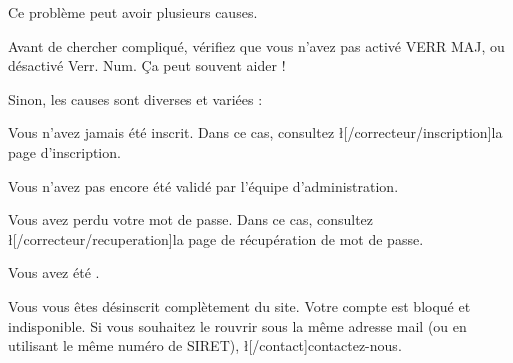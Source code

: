 Ce problème peut avoir plusieurs causes.

Avant de chercher compliqué, vérifiez que vous n'avez pas activé VERR MAJ, ou désactivé Verr. Num. Ça peut souvent aider !

Sinon, les causes sont diverses et variées :
\item Vous n'avez jamais été inscrit. Dans ce cas, consultez \l[/correcteur/inscription]{la page d'inscription}.
\item Vous n'avez pas encore été validé par l'équipe d'administration.
\item Vous avez perdu votre mot de passe. Dans ce cas, consultez \l[/correcteur/recuperation]{la page de récupération de mot de passe}.
\item Vous avez été .
\item Vous vous êtes désinscrit complètement du site. Votre compte est bloqué et indisponible. Si vous souhaitez le rouvrir sous la même adresse mail (ou en utilisant le même numéro de SIRET), \l[/contact]{contactez-nous}.
